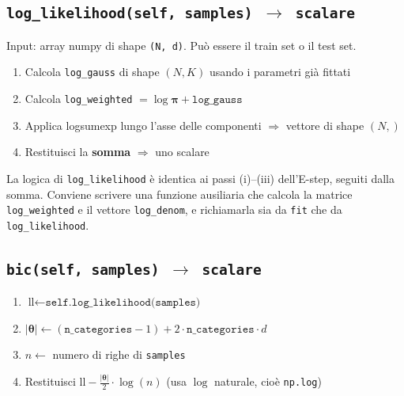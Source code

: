 \documentclass[11pt,a4paper]{article}
\begin{document}
\subsection{\texttt{log\_likelihood(self, samples) $\to$ scalare}}

Input: array numpy di shape \texttt{(N, d)}. Pu\`o essere il train set o il test set.

\begin{enumerate}
    \item Calcola \texttt{log\_gauss} di shape $(N, K)$ usando i parametri gi\`a fittati
    \item Calcola \texttt{log\_weighted} $= \log\boldsymbol{\pi} + \texttt{log\_gauss}$
    \item Applica logsumexp lungo l'asse delle componenti $\Rightarrow$ vettore di shape $(N,)$
    \item Restituisci la \textbf{somma} $\Rightarrow$ uno scalare
\end{enumerate}

\begin{infobox}
La logica di \texttt{log\_likelihood} \`e identica ai passi (i)--(iii) dell'E-step, seguiti dalla somma. Conviene scrivere una funzione ausiliaria che calcola la matrice \texttt{log\_weighted} e il vettore \texttt{log\_denom}, e richiamarla sia da \texttt{fit} che da \texttt{log\_likelihood}.
\end{infobox}

\subsection{\texttt{bic(self, samples) $\to$ scalare}}

\begin{enumerate}
    \item $\text{ll} \leftarrow \texttt{self.log\_likelihood(samples)}$
    \item $|\boldsymbol{\theta}| \leftarrow (\texttt{n\_categories} - 1) + 2 \cdot \texttt{n\_categories} \cdot d$
    \item $n \leftarrow$ numero di righe di \texttt{samples}
    \item Restituisci $\text{ll} - \frac{|\boldsymbol{\theta}|}{2} \cdot \log(n)$ \quad (usa $\log$ naturale, cio\`e \texttt{np.log})
\end{enumerate}
\end{document}

